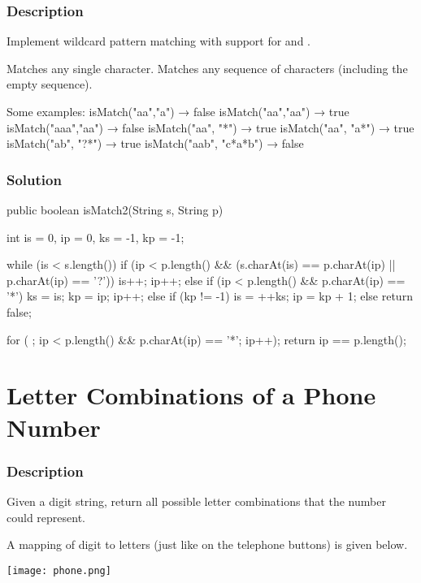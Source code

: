\subsubsection{Description}
Implement wildcard pattern matching with support for  and .

 Matches any single character.
 Matches any sequence of characters (including the empty sequence).

\begin{Code}
Some examples:
isMatch("aa","a") → false
isMatch("aa","aa") → true
isMatch("aaa","aa") → false
isMatch("aa", "*") → true
isMatch("aa", "a*") → true
isMatch("ab", "?*") → true
isMatch("aab", "c*a*b") → false
\end{Code}

\subsubsection{Solution}
\begin{Code}
public boolean isMatch2(String s, String p) {
    int is = 0, ip = 0, ks = -1, kp = -1;

    while (is < s.length()) {
        if (ip < p.length() && (s.charAt(is) == p.charAt(ip) || p.charAt(ip) == '?')) {
            is++;
            ip++;
        } else if (ip < p.length() && p.charAt(ip) == '*') {
            ks = is;
            kp = ip;
            ip++;
        } else if (kp != -1) {
            is = ++ks;
            ip = kp + 1;
        } else {
            return false;
        }
    }

    for ( ; ip < p.length() && p.charAt(ip) == '*'; ip++);
    return ip == p.length();
}
\end{Code}

\newpage

\section{Letter Combinations of a Phone Number}

\subsubsection{Description}
Given a digit string, return all possible letter combinations that the number could represent.

A mapping of digit to letters (just like on the telephone buttons) is given below.

\begin{center}
\texttt{[image: phone.png]}\\
\label{fig:phone-keyboard}
\end{center}

